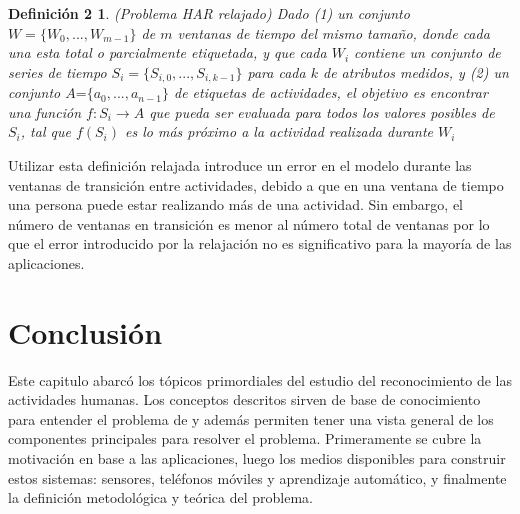 \newtheorem{defi}{Definición 2}

\begin{defi}(Problema HAR relajado) Dado (1) un conjunto $W=\{W_{0},...,W_{m-1}\}$
de $m$ ventanas de tiempo del mismo tamaño, donde cada una esta total
o parcialmente etiquetada, y que cada $W_{i}$ contiene un conjunto
de series de tiempo $S_{i}=\{S_{i,0},...,S_{i,k-1}\}$ para cada $k$
de atributos medidos, y (2) un conjunto $A\text{=}\{a_{0},...,a_{n-1}\}$
de etiquetas de actividades, el objetivo es encontrar una función
$f\colon S_{i}\rightarrow A$ que pueda ser evaluada para todos los
valores posibles de $S_{i}$, tal que $f(S_{i})$ es lo más próximo
a la actividad realizada durante $W_{i}$ \end{defi}

Utilizar esta definición relajada introduce un error en el modelo
durante las ventanas de transición entre actividades, debido a que
en una ventana de tiempo una persona puede estar realizando más de
una actividad. Sin embargo, el número de ventanas en transición es
menor al número total de ventanas por lo que el error introducido
por la relajación no es significativo para la mayoría de las aplicaciones.

\section{Conclusión}

\label{sec27:conclusion}Este capitulo abarcó los tópicos primordiales
del estudio del reconocimiento de las actividades humanas. Los conceptos
descritos sirven de base de conocimiento para entender el problema
de  y además permiten tener una vista general de los componentes
principales para resolver el problema. Primeramente se cubre la motivación
en base a las aplicaciones, luego los medios disponibles para construir
estos sistemas: sensores, teléfonos móviles y aprendizaje automático,
y finalmente la definición metodológica y teórica del problema. 
